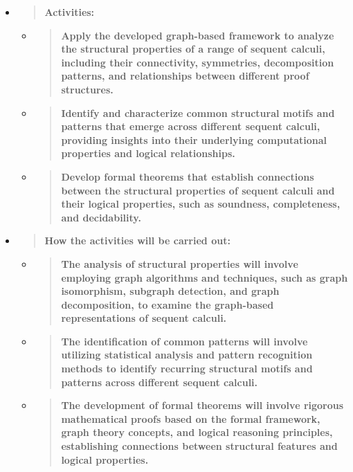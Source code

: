 \begin{itemize}
\item
  \begin{quote}
  \textbf{Activities:\\
  }
  \end{quote}

  \begin{itemize}
  \item
    \begin{quote}
    \textbf{Apply the developed graph-based framework to analyze the
    structural properties of a range of sequent calculi, including their
    connectivity, symmetries, decomposition patterns, and relationships
    between different proof structures.}
    \end{quote}
  \item
    \begin{quote}
    \textbf{Identify and characterize common structural motifs and
    patterns that emerge across different sequent calculi, providing
    insights into their underlying computational properties and logical
    relationships.}
    \end{quote}
  \item
    \begin{quote}
    \textbf{Develop formal theorems that establish connections between
    the structural properties of sequent calculi and their logical
    properties, such as soundness, completeness, and decidability.}
    \end{quote}
  \end{itemize}
\item
  \begin{quote}
  \textbf{How the activities will be carried out:\\
  }
  \end{quote}

  \begin{itemize}
  \item
    \begin{quote}
    \textbf{The analysis of structural properties will involve employing
    graph algorithms and techniques, such as graph isomorphism, subgraph
    detection, and graph decomposition, to examine the graph-based
    representations of sequent calculi.}
    \end{quote}
  \item
    \begin{quote}
    \textbf{The identification of common patterns will involve utilizing
    statistical analysis and pattern recognition methods to identify
    recurring structural motifs and patterns across different sequent
    calculi.}
    \end{quote}
  \item
    \begin{quote}
    \textbf{The development of formal theorems will involve rigorous
    mathematical proofs based on the formal framework, graph theory
    concepts, and logical reasoning principles, establishing connections
    between structural features and logical properties.}
    \end{quote}
  \end{itemize}
\end{itemize}

